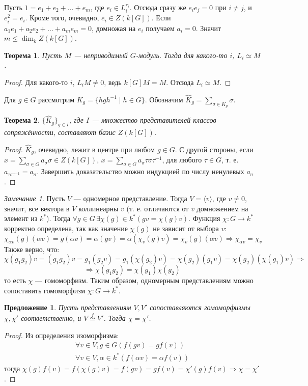 \documentclass{article}
\newtheorem*{theorem}{Теорема}
\newtheorem*{proposition}{Предложение}
\theoremstyle{definition}
\theoremstyle{remark}
\newtheorem*{remark}{Замечание}
\newcommand{\Ra}{\Rightarrow}
\begin{document}
Пусть $1 = e_1 + e_2 + \ldots + e_m$, где $e_i \in L_i^{r_i}$. Отсюда сразу же 
$e_ie_j = 0$ при $i \neq j$, и $e_i^2 = e_i$. Кроме того, очевидно, $e_i \in Z(k[G])$.
Если $a_1e_1 + a_2e_2 + \ldots + a_m e_m = 0$, домножая на $e_i$ получаем $a_i = 0$. Значит $m \leq \dim_kZ(k[G])$.
\begin{theorem}
Пусть $M$ --- неприводимый $G$-модуль. Тогда для какого-то $i$, $L_i \simeq M$.
\end{theorem}
\begin{proof}
	Для какого-то $i$, $L_iM \neq 0$, ведь $k[G]M = M$. Отсюда $L_i \simeq M$.
\end{proof}

Для $g \in G$ рассмотрим $K_g = \{hgh^{-1} \mid h \in G\}$.
Обозначим $\hat{K}_g = \sum\limits_{\sigma \in K_g}\sigma$.
\begin{theorem}
$\{\hat{K}_g\}_{g \in I}$, где $I$ --- множество представителей классов сопряжённости, составляют базис $Z(k[G])$.
\end{theorem}
\begin{proof}
$\hat{K}_g$, очевидно, лежит в центре при любом $g \in G$. С другой стороны, если
$x = \sum\limits_{\sigma \in G} a_\sigma \sigma \in Z(k[G])$,
$x = \sum\limits_{\sigma \in G} a_\sigma \tau \sigma \tau^{-1}$, для любого $\tau \in G$, т. е. $a_{\tau \sigma \tau^{-1}} = a_\sigma$. Завершить доказательство можно индукцией по числу ненулевых $a_\sigma$.
	\end{proof}

\begin{remark}
    Пусть $V$ --- одномерное представление. Тогда $V = \langle v \rangle$, где $v \neq 0$, значит, все вектора в $V$ коллинеарны $v$ (т. е. отличаются от $v$ домножением на элемент из $k^*$). Тогда $\forall g \in G \,\exists \chi(g) \in k^* (gv = \chi(g)v)$. Функция $\chi: G \to k^*$ корректно определена, так как значение $\chi(g)$ не зависит от выбора $v$:
    \[
        \chi_{\alpha v}(g)(\alpha v) = g(\alpha v) = \alpha (g v) = \alpha (\chi_v(g) v) = \chi_v(g)(\alpha v) \Ra \chi_{\alpha v} = \chi_v
    \]
    Также верно, что:
    \[
        \chi(g_1 g_2) v = (g_1 g_2) v = g_1 (g_2 v) = g_1 (\chi(g_2) v) = \chi(g_2) (g_1 v) = \chi(g_2) (\chi(g_1) v) \Ra
    \]
    \[
        \Ra \chi(g_1 g_2) = \chi(g_1) \chi(g_2)
    \]
    то есть $\chi$ --- гомоморфизм. Таким образом, одномерным представлениям можно сопоставить гомоморфизм $\chi: G \to k^*$.
\end{remark}

\begin{proposition}
    Пусть представлениям $V, V'$ сопоставляются гомоморфизмы $\chi, \chi'$ соответственно, и $V \overset{f}{\simeq} V'$. Тогда $\chi = \chi'$.
\end{proposition}
\begin{proof}
    Из определения изоморфизма:
    \begin{gather*}
        \forall v \in V, g \in G (f(g v) = g f(v)) \\
        \forall v \in V, \alpha \in k^* (f(\alpha v) = \alpha f(v))
    \end{gather*}
    тогда $\chi(g) f(v) = f(\chi(g) v) = f(g v) = g f(v) = \chi'(g) f(v) \Ra \chi = \chi'$.
\end{proof}
\end{document}
